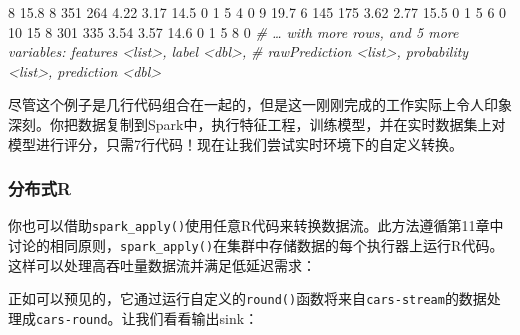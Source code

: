 \documentclass[
]{article}
\newenvironment{Shaded}{\begin{snugshade}}{\end{snugshade}}
\newcommand{\CommentTok}[1]{\textcolor[rgb]{0.56,0.35,0.01}{\textit{#1}}}
\newcommand{\DataTypeTok}[1]{\textcolor[rgb]{0.13,0.29,0.53}{#1}}
\newcommand{\DecValTok}[1]{\textcolor[rgb]{0.00,0.00,0.81}{#1}}
\newcommand{\FloatTok}[1]{\textcolor[rgb]{0.00,0.00,0.81}{#1}}
\newcommand{\KeywordTok}[1]{\textcolor[rgb]{0.13,0.29,0.53}{\textbf{#1}}}
\newcommand{\NormalTok}[1]{#1}
\newcommand{\OperatorTok}[1]{\textcolor[rgb]{0.81,0.36,0.00}{\textbf{#1}}}
\newcommand{\StringTok}[1]{\textcolor[rgb]{0.31,0.60,0.02}{#1}}
\begin{document}
\begin{Shaded}
\begin{Highlighting}[]
 \DecValTok{8} \FloatTok{15.8} \DecValTok{8} \DecValTok{351} \DecValTok{264} \FloatTok{4.22} \FloatTok{3.17} \FloatTok{14.5} \DecValTok{0} \DecValTok{1} \DecValTok{5} \DecValTok{4} \DecValTok{0}
 \DecValTok{9} \FloatTok{19.7} \DecValTok{6} \DecValTok{145} \DecValTok{175} \FloatTok{3.62} \FloatTok{2.77} \FloatTok{15.5} \DecValTok{0} \DecValTok{1} \DecValTok{5} \DecValTok{6} \DecValTok{0}
\DecValTok{10} \DecValTok{15} \DecValTok{8} \DecValTok{301} \DecValTok{335} \FloatTok{3.54} \FloatTok{3.57} \FloatTok{14.6} \DecValTok{0} \DecValTok{1} \DecValTok{5} \DecValTok{8} \DecValTok{0}
\CommentTok{# … with more rows, and 5 more variables: features <list>, label <dbl>,}
\CommentTok{# rawPrediction <list>, probability <list>, prediction <dbl>}
\end{Highlighting}
\end{Shaded}

尽管这个例子是几行代码组合在一起的，但是这一刚刚完成的工作实际上令人印象深刻。你把数据复制到Spark中，执行特征工程，训练模型，并在实时数据集上对模型进行评分，只需7行代码！现在让我们尝试实时环境下的自定义转换。

\hypertarget{ux5206ux5e03ux5f0fr-1}{%
\subsubsection{分布式R}\label{ux5206ux5e03ux5f0fr-1}}

你也可以借助\texttt{spark\_apply()}使用任意R代码来转换数据流。此方法遵循第11章中讨论的相同原则，\texttt{spark\_apply()}在集群中存储数据的每个执行器上运行R代码。这样可以处理高吞吐量数据流并满足低延迟需求：

\begin{Shaded}
\end{Shaded}

正如可以预见的，它通过运行自定义的\texttt{round()}函数将来自\texttt{cars-stream}的数据处理成\texttt{cars-round}。让我们看看输出sink：
\end{document}

